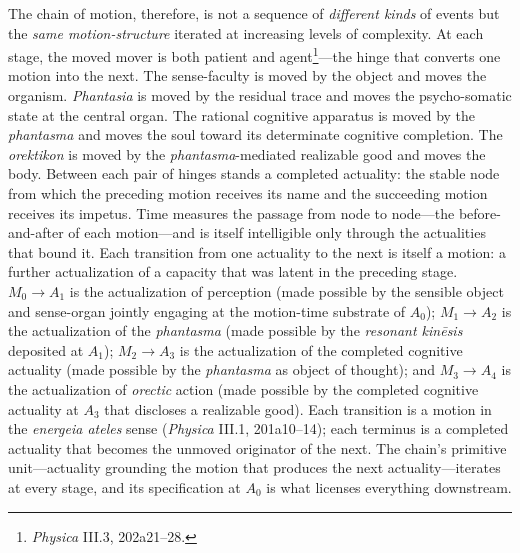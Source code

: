 \documentclass{article}
\begin{document}
The chain of motion, therefore, is not a sequence of \textit{different kinds} of events but the \textit{same motion-structure} iterated at increasing levels of complexity. At each stage, the moved mover is both patient and agent\footnote{\textit{Physica} III.3, 202a21--28.}---the hinge that converts one motion into the next. The sense-faculty is moved by the object and moves the organism. \textit{Phantasia} is moved by the residual trace and moves the psycho-somatic state at the central organ. The rational cognitive apparatus is moved by the \textit{phantasma} and moves the soul toward its determinate cognitive completion. The \textit{orektikon} is moved by the \textit{phantasma}-mediated realizable good and moves the body. Between each pair of hinges stands a completed actuality: the stable node from which the preceding motion receives its name and the succeeding motion receives its impetus. Time measures the passage from node to node---the before-and-after of each motion---and is itself intelligible only through the actualities that bound it. Each transition from one actuality to the next is itself a motion: a further actualization of a capacity that was latent in the preceding stage. $M_0 \rightarrow A_1$ is the actualization of perception (made possible by the sensible object and sense-organ jointly engaging at the motion-time substrate of $A_0$); $M_1 \rightarrow A_2$ is the actualization of the \textit{phantasma} (made possible by the \textit{resonant kinēsis} deposited at $A_1$); $M_2 \rightarrow A_3$ is the actualization of the completed cognitive actuality (made possible by the \textit{phantasma} as object of thought); and $M_3 \rightarrow A_4$ is the actualization of \textit{orectic} action (made possible by the completed cognitive actuality at $A_3$ that discloses a realizable good). Each transition is a motion in the \textit{energeia ateles} sense (\textit{Physica} III.1, 201a10--14); each terminus is a completed actuality that becomes the unmoved originator of the next. The chain's primitive unit---actuality grounding the motion that produces the next actuality---iterates at every stage, and its specification at $A_0$ is what licenses everything downstream. 
\end{document}
